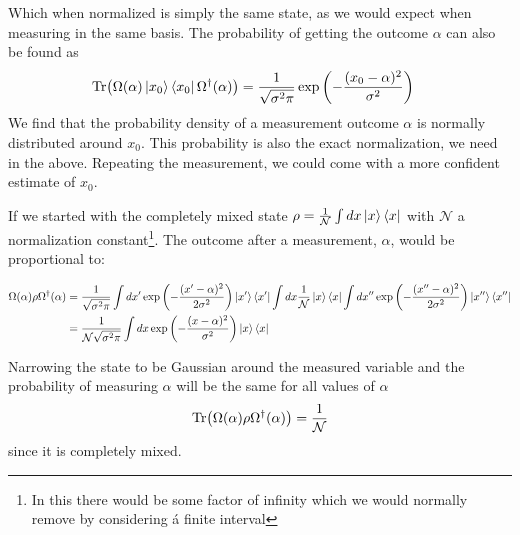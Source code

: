 Which when normalized is simply the same state, as we would expect when measuring in the same basis. The probability of getting the outcome $\alpha$ can also be found as
\begin{align}
    \Tr(\Omega(\alpha) \ket{x_0}\bra{x_0} \Omega^\dagger(\alpha)) &= \frac{1}{\sqrt{\sigma^2\pi}} \exp\left(-\frac{(x_0 - \alpha)^2}{\sigma^2}\right)
\end{align}
We find that the probability density of a measurement outcome $\alpha$ is normally distributed around $x_0$. This probability is also the exact normalization, we need in the above. Repeating the measurement, we could come with a more confident estimate of $x_0$.

If we started with the completely mixed state $\rho = \frac{1}{\mathcal{N}}\int dx \ket{x}\bra{x}$ with $\mathcal{N}$ a normalization constant\footnote{In this there would be some factor of infinity which we would normally remove by considering á finite interval}. The outcome after a measurement, $\alpha$, would be proportional to:
\begin{fullwidth}
\begin{align}
        \Omega(\alpha) \rho  \Omega^\dagger(\alpha) &= \frac{1}{\sqrt{\sigma^2\pi}}\int dx' \exp\left(-\frac{(x'- \alpha)^2}{2\sigma^2}\right)\ket{x'}\bra{x'}\int dx \frac{1}{\mathcal{N}}\ket{x}\bra{x}\int dx'' \exp\left(-\frac{(x''- \alpha)^2}{2\sigma^2}\right)\ket{x''}\bra{x''} \nonumber \\
        &= \frac{1}{\mathcal{N}\sqrt{\sigma^2\pi}}\int dx\exp\left(-\frac{(x- \alpha)^2}{\sigma^2}\right)\ket{x}\bra{x}
\end{align}
\end{fullwidth}
Narrowing the state to be Gaussian around the measured variable and the probability of measuring $\alpha$ will be the same for all values of $\alpha$
\begin{equation}
     \Tr(\Omega(\alpha) \rho \Omega^\dagger(\alpha)) = \frac{1}{\mathcal{N}}
\end{equation}
since it is completely mixed. 


